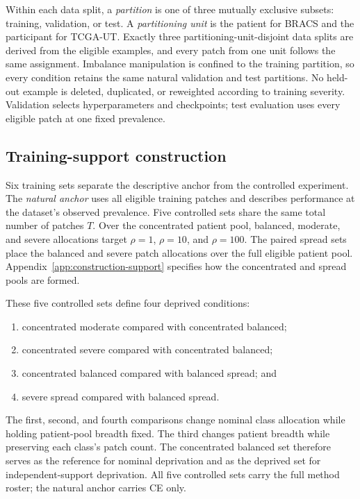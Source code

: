 \documentclass[11pt]{article}
\begin{document}
Within each data split, a \emph{partition} is one of three mutually exclusive subsets: training, validation, or test. A \emph{partitioning unit} is the patient for BRACS and the participant for TCGA-UT. Exactly three partitioning-unit-disjoint data splits are derived from the eligible examples, and every patch from one unit follows the same assignment. Imbalance manipulation is confined to the training partition, so every condition retains the same natural validation and test partitions. No held-out example is deleted, duplicated, or reweighted according to training severity. Validation selects hyperparameters and checkpoints; test evaluation uses every eligible patch at one fixed prevalence.

\subsection{Training-support construction}
Six training sets separate the descriptive anchor from the controlled experiment. The \emph{natural anchor} uses all eligible training patches and describes performance at the dataset's observed prevalence. Five controlled sets share the same total number of patches $T$. Over the concentrated patient pool, balanced, moderate, and severe allocations target $\rho=1$, $\rho=10$, and $\rho=100$. The paired spread sets place the balanced and severe patch allocations over the full eligible patient pool. Appendix~\ref{app:construction-support} specifies how the concentrated and spread pools are formed.

These five controlled sets define four deprived conditions:
\begin{enumerate}
  \item concentrated moderate compared with concentrated balanced;
  \item concentrated severe compared with concentrated balanced;
  \item concentrated balanced compared with balanced spread; and
  \item severe spread compared with balanced spread.
\end{enumerate}
\par\noindent The first, second, and fourth comparisons change nominal class allocation while holding patient-pool breadth fixed. The third changes patient breadth while preserving each class's patch count. The concentrated balanced set therefore serves as the reference for nominal deprivation and as the deprived set for independent-support deprivation. All five controlled sets carry the full method roster; the natural anchor carries CE only.
\end{document}
